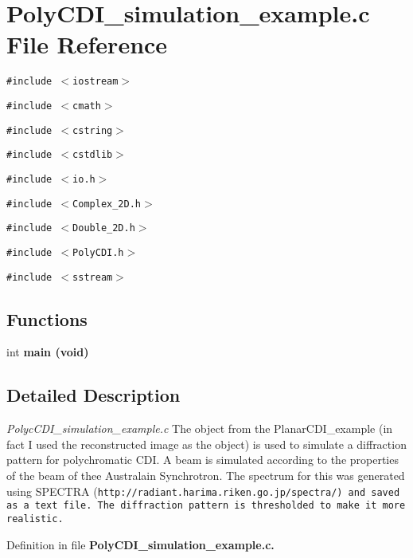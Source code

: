 \section{Poly\-CDI\_\-simulation\_\-example.c File Reference}
\label{PolyCDI__simulation__example_8c}
{\tt \#include $<$iostream$>$}\par
{\tt \#include $<$cmath$>$}\par
{\tt \#include $<$cstring$>$}\par
{\tt \#include $<$cstdlib$>$}\par
{\tt \#include $<$io.h$>$}\par
{\tt \#include $<$Complex\_\-2D.h$>$}\par
{\tt \#include $<$Double\_\-2D.h$>$}\par
{\tt \#include $<$Poly\-CDI.h$>$}\par
{\tt \#include $<$sstream$>$}\par
\subsection*{Functions}
\begin{CompactItemize}
\item 
int \bf{main} (void)\label{PolyCDI__simulation__example_8c_5ad1c26f00c2399d3a5c7850100212d0}

\end{CompactItemize}


\subsection{Detailed Description}
{\em Polyc\-CDI\_\-simulation\_\-example.c\/} The object from the Planar\-CDI\_\-example (in fact I used the reconstructed image as the object) is used to simulate a diffraction pattern for polychromatic CDI. A beam is simulated according to the properties of the beam of thee Australain Synchrotron. The spectrum for this was generated using SPECTRA (\tt{http://radiant.harima.riken.go.jp/spectra/}) and saved as a text file. The diffraction pattern is thresholded to make it more realistic. 

Definition in file \bf{Poly\-CDI\_\-simulation\_\-example.c}.